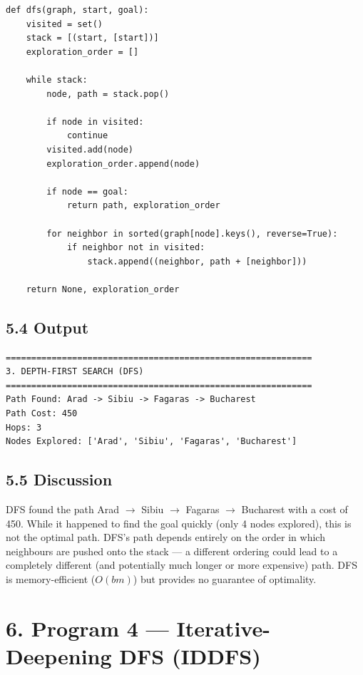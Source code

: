 \documentclass[12pt,a4paper]{article}
\begin{document}
\begin{lstlisting}[style=plain, caption={Depth-First Search}]
def dfs(graph, start, goal):
    visited = set()
    stack = [(start, [start])]
    exploration_order = []

    while stack:
        node, path = stack.pop()

        if node in visited:
            continue
        visited.add(node)
        exploration_order.append(node)

        if node == goal:
            return path, exploration_order

        for neighbor in sorted(graph[node].keys(), reverse=True):
            if neighbor not in visited:
                stack.append((neighbor, path + [neighbor]))

    return None, exploration_order
\end{lstlisting}

\subsection*{5.4 Output}

\begin{verbatim}
============================================================
3. DEPTH-FIRST SEARCH (DFS)
============================================================
Path Found: Arad -> Sibiu -> Fagaras -> Bucharest
Path Cost: 450
Hops: 3
Nodes Explored: ['Arad', 'Sibiu', 'Fagaras', 'Bucharest']
\end{verbatim}

\subsection*{5.5 Discussion}

DFS found the path Arad $\rightarrow$ Sibiu $\rightarrow$ Fagaras $\rightarrow$ Bucharest with a cost of 450. While it happened to find the goal quickly (only 4 nodes explored), this is not the optimal path. DFS's path depends entirely on the order in which neighbours are pushed onto the stack --- a different ordering could lead to a completely different (and potentially much longer or more expensive) path. DFS is memory-efficient ($O(bm)$) but provides no guarantee of optimality.

\section*{6. Program 4 --- Iterative-Deepening DFS (IDDFS)}
\end{document}
